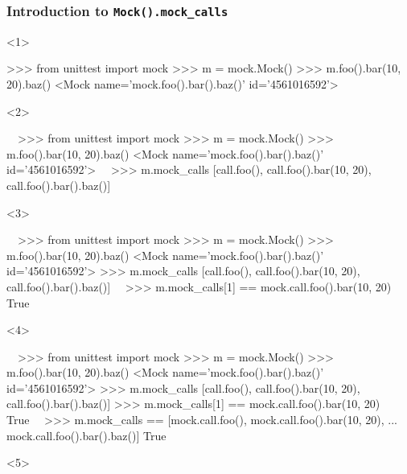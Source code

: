 \documentclass[xcolor={svgnames}]{beamer}
\newcommand{\ttcode}[2][]{\lstinline[style=plain,basicstyle=\ttfamily#1]{#2}}
\begin{document}
\begin{frame}[t,fragile]
    \frametitle{Introduction to \ttcode{Mock().mock_calls}}
    \begin{onlyenv}<1>
        \begin{pyenv}[gobble=12]
            >>> from unittest import mock
            >>> m = mock.Mock()
            >>> m.foo().bar(10, 20).baz()
            <Mock name='mock.foo().bar().baz()' id='4561016592'>
        \end{pyenv}
    \end{onlyenv}
    \begin{onlyenv}<2>
        \begin{pyenv}[gobble=12]
            ~~>>> from unittest import mock
            >>> m = mock.Mock()
            >>> m.foo().bar(10, 20).baz()
            <Mock name='mock.foo().bar().baz()' id='4561016592'>~~
            >>> m.mock_calls
            [call.foo(), call.foo().bar(10, 20), call.foo().bar().baz()]
        \end{pyenv}
    \end{onlyenv}
    \begin{onlyenv}<3>
        \begin{pyenv}[gobble=12]
            ~~>>> from unittest import mock
            >>> m = mock.Mock()
            >>> m.foo().bar(10, 20).baz()
            <Mock name='mock.foo().bar().baz()' id='4561016592'>
            >>> m.mock_calls
            [call.foo(), call.foo().bar(10, 20), call.foo().bar().baz()]~~
            >>> m.mock_calls[1] == mock.call.foo().bar(10, 20)
            True
        \end{pyenv}
    \end{onlyenv}
    \begin{onlyenv}<4>
        \begin{pyenv}[gobble=12]
            ~~>>> from unittest import mock
            >>> m = mock.Mock()
            >>> m.foo().bar(10, 20).baz()
            <Mock name='mock.foo().bar().baz()' id='4561016592'>
            >>> m.mock_calls
            [call.foo(), call.foo().bar(10, 20), call.foo().bar().baz()]
            >>> m.mock_calls[1] == mock.call.foo().bar(10, 20)
            True~~
            >>> m.mock_calls == [mock.call.foo(), mock.call.foo().bar(10, 20),
            ...                  mock.call.foo().bar().baz()]
            True
        \end{pyenv}
    \end{onlyenv}
    \begin{onlyenv}<5>

\end{onlyenv}
\end{frame}
\end{document}
